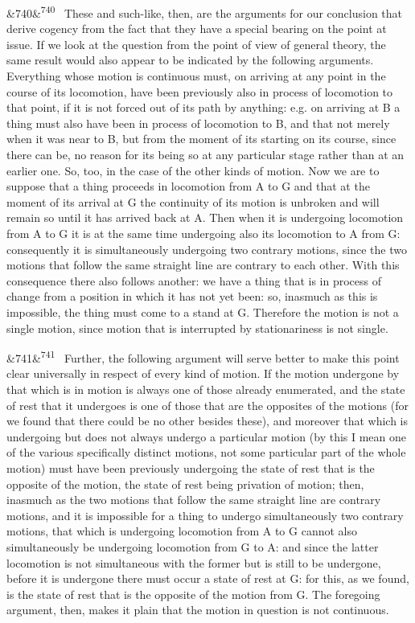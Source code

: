 \documentclass[12pt]{article}
\newcommand{\para}[1][]{\par\noindent\ifx&#1&\else\textsuperscript{\footnotesize #1}~\fi}
\begin{document}
\para[740] These and such-like, then, are the arguments for our conclusion that derive cogency from the fact that they have a special bearing on the point at issue. If we look at the question from the point of view of general theory, the same result would also appear to be indicated by the following arguments. Everything whose motion is continuous must, on arriving at any point in the course of its locomotion, have been previously also in process of locomotion to that point, if it is not forced out of its path by anything: e.g. on arriving at B a thing must also have been in process of locomotion to B, and that not merely when it was near to B, but from the moment of its starting on its course, since there can be, no reason for its being so at any particular stage rather than at an earlier one. So, too, in the case of the other kinds of motion. Now we are to suppose that a thing proceeds in locomotion from A to G and that at the moment of its arrival at G the continuity of its motion is unbroken and will remain so until it has arrived back at A. Then when it is undergoing locomotion from A to G it is at the same time undergoing also its locomotion to A from G: consequently it is simultaneously undergoing two contrary motions, since the two motions that follow the same straight line are contrary to each other. With this consequence there also follows another: we have a thing that is in process of change from a position in which it has not yet been: so, inasmuch as this is impossible, the thing must come to a stand at G. Therefore the motion is not a single motion, since motion that is interrupted by stationariness is not single.

\para[741] Further, the following argument will serve better to make this point clear universally in respect of every kind of motion. If the motion undergone by that which is in motion is always one of those already enumerated, and the state of rest that it undergoes is one of those that are the opposites of the motions (for we found that there could be no other besides these), and moreover that which is undergoing but does not always undergo a particular motion (by this I mean one of the various specifically distinct motions, not some particular part of the whole motion) must have been previously undergoing the state of rest that is the opposite of the motion, the state of rest being privation of motion; then, inasmuch as the two motions that follow the same straight line are contrary motions, and it is impossible for a thing to undergo simultaneously two contrary motions, that which is undergoing locomotion from A to G cannot also simultaneously be undergoing locomotion from G to A: and since the latter locomotion is not simultaneous with the former but is still to be undergone, before it is undergone there must occur a state of rest at G: for this, as we found, is the state of rest that is the opposite of the motion from G. The foregoing argument, then, makes it plain that the motion in question is not continuous.
\end{document}
